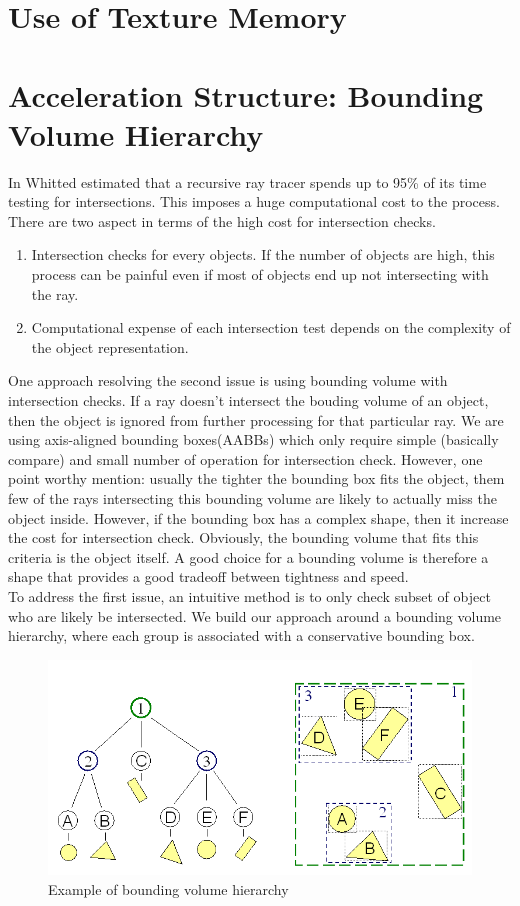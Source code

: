 \documentclass[a4paper,10pt]{article}
\begin{document}
\section{Use of Texture Memory}


\section{Acceleration Structure: Bounding Volume Hierarchy}
In \cite{whitted2005improved} Whitted estimated that a recursive ray tracer spends up to 95\% of its time testing for intersections. This imposes a huge computational cost to the process. There are two aspect in terms of the high cost for intersection checks. 
\begin{enumerate}
    \item Intersection checks for every objects. If the number of objects are high, this process can be painful even if most of objects end up not intersecting with the ray.
    \item Computational expense of each intersection test depends on the complexity of the object representation. 
\end{enumerate}
One approach resolving the second issue is using bounding volume with intersection checks. If a ray doesn't intersect the bouding volume of an object, then the object is ignored from further processing for that particular ray. We are using axis-aligned bounding boxes(AABBs) which only require simple (basically compare) and small number of operation for intersection check. However, one point worthy mention: usually the tighter the bounding box fits the object, them few of the rays intersecting this bounding volume are likely to actually miss the object inside. However, if the bounding box has a complex shape, then it increase the cost for intersection check. Obviously, the bounding volume that fits this criteria is the object itself. A good choice for a bounding volume is therefore a shape that provides a good tradeoff between tightness and speed. \\
To address the first issue, an intuitive method is to only check subset of object who are likely be intersected. We build our approach around a bounding volume hierarchy, where each group is associated with a conservative bounding box. 
\begin{figure}[H]
    \centering
    \includegraphics[scale=0.3]{bvh.png}
    \caption{Example of bounding volume hierarchy}
    \label{fig:bvh}
\end{figure}
\end{document}
